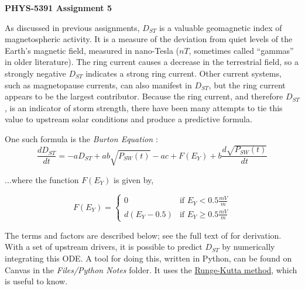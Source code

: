 \documentclass[12pt, letterpaper]{article}
\begin{document}
\begin{center}
  {\LARGE \textbf{PHYS-5391 Assignment 5}}\\
\end{center}

As discussed in previous assignments, $D_{ST}$ is a valuable geomagnetic index
of magnetospheric activity.  It is a measure of the deviation from quiet levels
of the Earth's magnetic field, measured in nano-Tesla ($nT$, sometimes called
``gammas'' in older literature).  The ring current causes a decrease in the
terrestrial field, so a strongly negative $D_{ST}$ indicates a strong ring
current.  Other current systems, such as magnetopause currents, can also
manifest in $D_{ST}$, but the ring current appears to be the largest
contributor.  Because the ring current, and therefore $D_{ST}$, is an indicator
of storm strength, there have been many attempts to tie this value to 
upstream solar conditions and produce a predictive formula.

One such formula is the \textit{Burton Equation} \citep{Burton:1975}:
\begin{equation}
  \frac{d D_{ST}}{dt}=-aD_{ST}+ab\sqrt{P_{SW}(t)}-ac+F(E_{Y})+
  b\frac{d\sqrt{P_{SW}(t)}}{dt}
\end{equation}

\noindent ...where the function $F(E_{Y})$ is given by,

\begin{equation}
  \label{eq:F}
  F(E_{Y}) = 
  \begin{cases}
    0 & \text{if $E_Y<0.5\frac{mV}{m}$}\\
    d(E_Y-0.5) & \text{if $E_Y\geq 0.5\frac{mV}{m}$}
  \end{cases}
\end{equation}

\noindent The terms and factors are described below; see the full
text of \citet{Burton:1975} for derivation. With a set of upstream drivers,
it is possible to predict $D_{ST}$ by numerically integrating this ODE.
A tool for doing this, written in Python, can be found on Canvas in the
\emph{Files/Python Notes} folder.
It uses the \href{http://lpsa.swarthmore.edu/NumInt/NumIntFourth.html}
{Runge-Kutta method}, which is useful to know.
\end{document}
